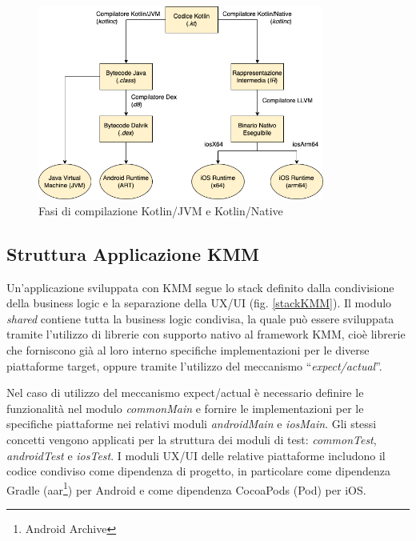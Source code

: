 \begin{figure}[H]
    \centering
    \includegraphics[width=0.84\textwidth]{img/compilatore_kotlin.png}
    \caption{Fasi di compilazione Kotlin/JVM e Kotlin/Native}
    \label{kotlin-native-compile}
\end{figure}

\subsection{Struttura Applicazione KMM}
Un'applicazione sviluppata con KMM segue lo stack definito dalla condivisione della business logic e la separazione della UX/UI (fig. \ref{stackKMM}). 
Il modulo \textit{shared} contiene tutta la business logic condivisa, 
la quale può essere sviluppata tramite l'utilizzo di librerie con supporto nativo al framework KMM, 
cioè librerie che forniscono già al loro interno specifiche implementazioni per le diverse piattaforme target, 
oppure tramite l'utilizzo del meccanismo ``\textit{expect/actual}''.

Nel caso di utilizzo del meccanismo expect/actual è necessario definire le funzionalità nel modulo \textit{commonMain} e fornire le implementazioni per le specifiche piattaforme nei relativi moduli \textit{androidMain} e \textit{iosMain}. 
Gli stessi concetti vengono applicati per la struttura dei moduli di test: \textit{commonTest}, \textit{androidTest} e \textit{iosTest}. 
I moduli UX/UI delle relative piattaforme includono il codice condiviso come dipendenza di progetto, 
in particolare come dipendenza Gradle (aar\footnote{Android Archive}) per Android e come dipendenza CocoaPods (Pod) per iOS.

